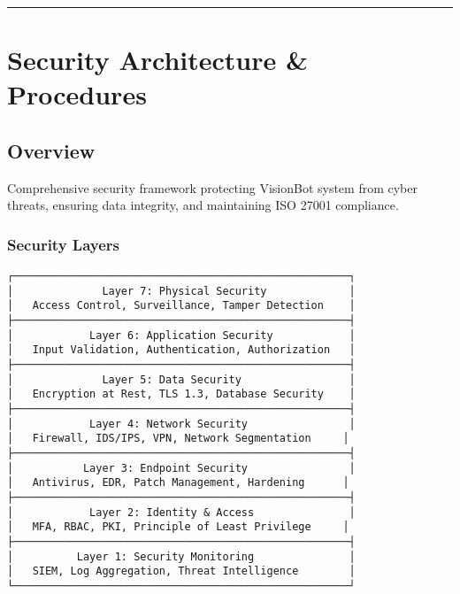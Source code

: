 \documentclass[
]{article}
\begin{document}
\begin{center}\rule{0.5\linewidth}{0.5pt}\end{center}

\hypertarget{security-architecture-procedures}{%
\section{Security Architecture \&
Procedures}\label{security-architecture-procedures}}

\hypertarget{overview}{%
\subsection{Overview}\label{overview}}

Comprehensive security framework protecting VisionBot system from cyber
threats, ensuring data integrity, and maintaining ISO 27001 compliance.

\hypertarget{security-layers}{%
\subsubsection{Security Layers}\label{security-layers}}

\begin{verbatim}
┌─────────────────────────────────────────────────────┐
│              Layer 7: Physical Security             │
│   Access Control, Surveillance, Tamper Detection    │
├─────────────────────────────────────────────────────┤
│            Layer 6: Application Security            │
│   Input Validation, Authentication, Authorization   │
├─────────────────────────────────────────────────────┤
│              Layer 5: Data Security                 │
│   Encryption at Rest, TLS 1.3, Database Security    │
├─────────────────────────────────────────────────────┤
│            Layer 4: Network Security                │
│   Firewall, IDS/IPS, VPN, Network Segmentation     │
├─────────────────────────────────────────────────────┤
│           Layer 3: Endpoint Security                │
│   Antivirus, EDR, Patch Management, Hardening      │
├─────────────────────────────────────────────────────┤
│            Layer 2: Identity & Access               │
│   MFA, RBAC, PKI, Principle of Least Privilege     │
├─────────────────────────────────────────────────────┤
│          Layer 1: Security Monitoring               │
│   SIEM, Log Aggregation, Threat Intelligence        │
└─────────────────────────────────────────────────────┘
\end{verbatim}
\end{document}
